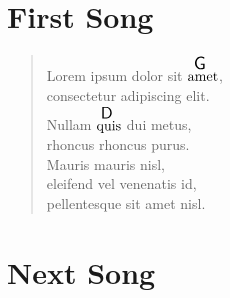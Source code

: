 \documentclass[twocolumn]{article}
\newcommand{\ch}[2]{$\overset{ \resizebox{0.3cm}{!}{\textsf{#2}} }{\text{#1}}$}
\begin{document}
\section*{First Song}

\begin{verse}

Lorem ipsum dolor sit $\overset{ \resizebox{0.3cm}{!}{\textsf{G}} }{\text{amet}}$, \\
consectetur adipiscing elit.\\
Nullam \ch{quis}{D} dui metus, \\
rhoncus rhoncus purus. \\
Mauris mauris nisl, \\
eleifend vel venenatis id, \\
pellentesque sit amet nisl.

\end{verse}

\section*{Next Song}
\end{document}
